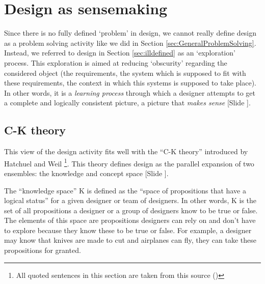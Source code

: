 \documentclass{article}
\newcounter{slide}
\begin{document}
\section{Design as sensemaking}
\label{sec:sensemaking}
Since there is no fully defined `problem' in design, we cannot really define design as a problem solving activity like we did in Section \ref{sec:GeneralProblemSolving}. Instead, we referred to design in Section \ref{sec:illdefined} as an `exploration' process. This exploration is aimed at reducing `obscurity' regarding the considered object (the requirements, the system which is supposed to fit with these requirements, the context in which this systems is supposed to take place). In other words, it is a \emph{learning process} through which a designer attempts to get a complete and logically consistent picture, a picture that \emph{makes sense} {\color{blue}[Slide ]}. 


\subsection{C-K theory}
\label{sec:CK}
This view of the design activity fits well with the ``C-K theory'' introduced by Hatchuel and Weil \cite{hatchuel2003new}\footnote{All quoted sentences in this section are taken from this source (\cite{hatchuel2003new})}. This theory defines design as the parallel expansion of two ensembles: the knowledge and concept space {\color{blue}[Slide ]}. 

The ``knowledge space'' K is defined as the ``space of propositions that have a logical status'' for a given designer or team of designers. In other words, K is the set of all propositions a designer or a group of designers know to be true or false. The elements of this space are propositions designers can rely on and don't have to explore because they know these to be true or false. For example, a designer may know that knives are made to cut and airplanes can fly, they can take these propositions for granted. 
\end{document}
